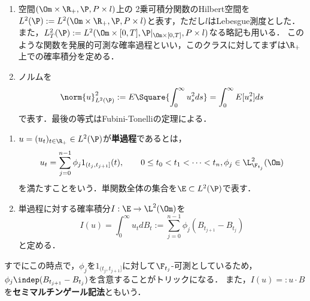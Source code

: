 \documentclass[uplatex,dvipdfmx]{jsreport}
\begin{document}
\begin{notation}[確率積分を定義する過程のクラス]\mbox{}
    \begin{enumerate}
        \item 空間$(\Om\times\R_+,\P,P\times l)$上の
        2乗可積分関数のHilbert空間を$L^2(\P):=L^2(\Om\times\R_+,\P,P\times l)$と表す，ただし$l$はLebesgue測度とした．
        また，$L^2_T(\P):=L^2(\Om\times[0,T],\P|_{\Om\times[0,T]},P\times l)$なる略記も用いる．
        このような関数を発展的可測な確率過程といい，このクラスに対してまずは$\R_+$上での確率積分を定める．
        \item ノルムを
        \[\norm{u}^2_{L^2(\P)}:=E\Square{\int^\infty_{0}u_s^2ds}=\int^\infty_0E[u^2_s]ds\]
        で表す．最後の等式はFubini-Tonelliの定理による．
    \end{enumerate}
\end{notation}

\begin{definition}\mbox{}
    \begin{enumerate}
        \item 
        $u=(u_t)_{t\in\R_+}\in L^2(\P)$が\textbf{単過程}であるとは，
        \[u_t=\sum_{j=0}^{n-1}\phi_j1_{(t_j,t_{j+1}]}(t),\qquad 0\le t_0<t_1<\cdots<t_n,\phi_j\in\L^2_{\F_{t_j}}(\Om)\]
        を満たすことをいう．単関数全体の集合を$\E\subset L^2(\P)$で表す．
        \item 単過程に対する確率積分$I:\E\to\L^2(\Om)$を
        \[I(u)=\int^\infty_0 u_tdB_t:=\sum^{n-1}_{j=0}\phi_j(B_{t_{j+1}}-B_{t_j})\]
        と定める．
    \end{enumerate}
\end{definition}
\begin{remarks}\label{remarks-tricks-in-the-definition-of-Ito-integral}
    すでにこの時点で，$\phi_j$を$1_{(t_j,t_{j+1}]}$に対して$\F_{t_j}$-可測としているため，$\phi_j\indep (B_{t_{j+1}}-B_{t_j})$を含意することがトリックになる．
    また，$I(u)=:u\cdot B$を\textbf{セミマルチンゲール記法}ともいう．
\end{remarks}
\end{document}
